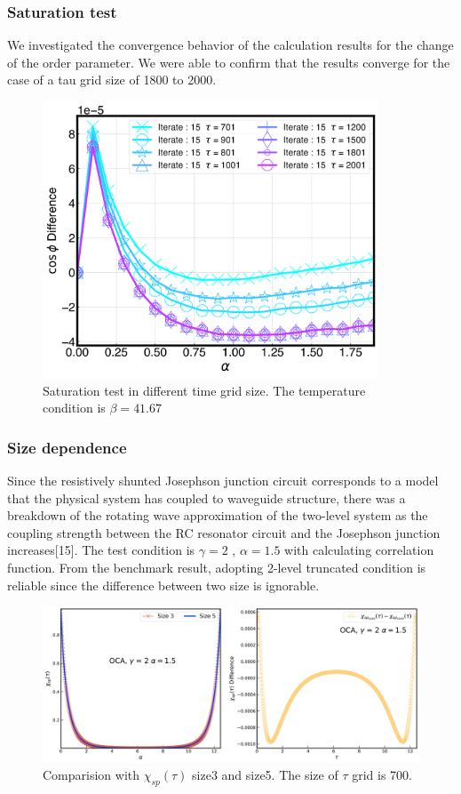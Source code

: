 \documentclass{article}[12pt]
\begin{document}
\begin{spacing}{1.5}
\subsubsection*{Saturation test}
We investigated the convergence behavior of the calculation results for the change of the order parameter. 
We were able to confirm that the results converge for the case of a tau grid size of 1800 to 2000. 
\begin{figure}[htbp]
  \centerline{\includegraphics[width=10cm]{TexFigure/Diff_Ns3_g_b_35.71_41.67_n_15_tauchange (1)-1.png}}
  \caption{Saturation test in different time grid size. The temperature condition is $\beta = 41.67$}
\end{figure}
\subsubsection*{Size dependence}
Since the resistively shunted Josephson junction circuit corresponds to a model that the physical system has coupled to waveguide structure,
there was a breakdown of the rotating wave approximation of the two-level system as the coupling strength between the RC resonator circuit 
and the Josephson junction increases[15]. The test condition is $\gamma =2$ , $\alpha = 1.5$ with calculating correlation function. 
From the benchmark result, adopting 2-level truncated condition is reliable since the difference between two size is ignorable.
\begin{figure}[H]
  \centerline{\includegraphics[width=15cm]{TexFigure/Sizediff.png}}
  \caption{Comparision with $\chi_{sp}(\tau)$ size3 and size5. The size of $\tau$ grid is 700.}
\end{figure}
\pagebreak

\end{spacing}
\end{document}
